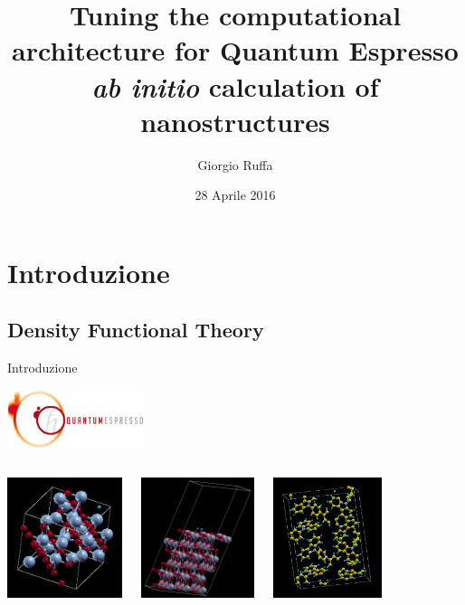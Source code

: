 \documentclass[8pt]{beamer}
\title[Tuning the computational architecture for Quantum Espresso \textit{ab initio} calculation of nanostructures] %
{Tuning the computational architecture for Quantum Espresso \textit{ab initio} calculation of nanostructures}
\author[Giorgio Ruffa] 
{Giorgio Ruffa}
\institute[Università degli Studi di Milano]{Università degli Studi di Milano}
\date{28 Aprile 2016}
\begin{document}
\begin{frame}
  \titlepage
\end{frame}

\section{Introduzione}
\subsection{Density Functional Theory}

\begin{frame}{Introduzione}
\begin{center}
		\includegraphics[width=4cm]{beam_qe_logo.jpg}
\end{center}
\begin{columns}
		\begin{center}
			\includegraphics[height=3.5cm]{beam_co3.png}
		\end{center}
		\begin{center}
			\includegraphics[height=3.5cm]{titania_crystal.png}
		\end{center}
		\begin{center}
			\includegraphics[height=3.5cm]{beam_cbp.png}
		\end{center}
\end{columns}
		
\end{frame}
\end{document}
